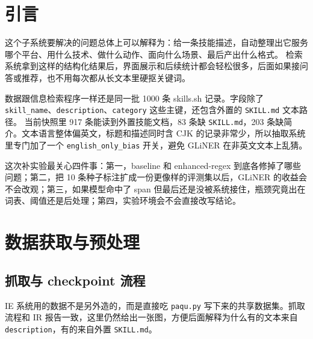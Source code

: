 \makecoverpage

\begin{abstract}
这次实验做的是一个偏工程型的信息抽取系统：从 skills.sh 的技能描述里抽出平台、技术栈、动作类型、目标领域、输出格式和量化指标六类信息。系统没有把所有责任都压给一个模型，而是拆成三层：baseline 负责精确关键字匹配，enhanced-regex 负责 alias 扩展、受控词表归一化和 fallback，enhanced-gliner 再把 GLiNER 接到前面做候选实体提取。

我们将评测集分成10条和24条两种，分别测量在不同基准下抽取系统的能力，分别比较 baseline、enhanced-regex 和 enhanced-gliner 这三种方法的结果。
结果显示，在 10 条种子集上，GLiNER 的 macro F1 仍然略低于 regex（59.00\% 对 59.59\%）；但扩展到 24 条以后，enhanced-gliner 的 macro F1 提到 75.29\%，比 enhanced-regex 的 73.63\% 高 1.66 个百分点，micro F1 也从 74.01\% 提到 74.65\%。

\end{abstract}

\section{引言}
这个子系统要解决的问题总体上可以解释为：给一条技能描述，自动整理出它服务哪个平台、用什么技术、做什么动作、面向什么场景、最后产出什么格式。
检索系统拿到这样的结构化结果后，界面展示和后续统计都会轻松很多，后面如果接问答或推荐，也不用每次都从长文本里硬抠关键词。

数据跟信息检索程序一样还是同一批 1000 条 skills.sh 记录。字段除了 \texttt{skill\_name}、\texttt{description}、\texttt{category} 这些主键，还包含外置的 \texttt{SKILL.md} 文本路径。
当前快照里 917 条能读到外置技能文档，83 条缺 \texttt{SKILL.md}，203 条缺简介。文本语言整体偏英文，标题和描述同时含 CJK 的记录非常少，所以抽取系统里专门加了一个 \texttt{english\_only\_bias} 开关，避免 GLiNER 在非英文文本上乱猜。

这次补实验最关心四件事：第一，baseline 和 enhanced-regex 到底各修掉了哪些问题；第二，把 10 条种子标注扩成一份更像样的评测集以后，GLiNER 的收益会不会改观；第三，如果模型命中了 span 但最后还是没被系统接住，瓶颈究竟出在词表、阈值还是后处理；第四，实验环境会不会直接改写结论。

\section{数据获取与预处理}
\subsection{抓取与 checkpoint 流程}
IE 系统用的数据不是另外造的，而是直接吃 \texttt{paqu.py} 写下来的共享数据集。抓取流程和 IR 报告一致，这里仍然给出一张图，方便后面解释为什么有的文本来自 \texttt{description}，有的来自外置 \texttt{SKILL.md}。

